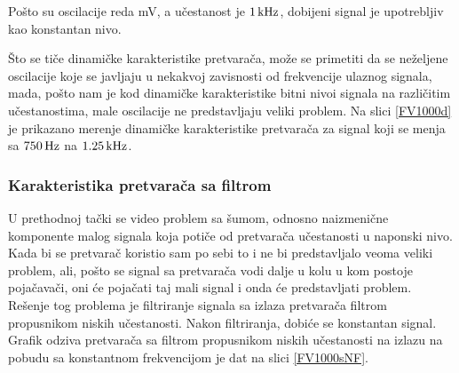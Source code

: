 \documentclass[a4paper, 12pt, diplomski]{etf}
\begin{document}
Pošto su oscilacije reda mV, a učestanost je $1\, \rm{kHz}$, dobijeni signal je upotrebljiv kao konstantan nivo. 

Što se tiče dinamičke karakteristike pretvarača, može se primetiti da se neželjene oscilacije koje se javljaju u nekakvoj zavisnosti od frekvencije ulaznog signala, mada, pošto nam je kod dinamičke karakteristike bitni nivoi signala na različitim učestanostima, male oscilacije ne predstavljaju veliki problem. Na slici \ref{FV1000d} je prikazano merenje dinamičke karakteristike pretvarača za signal koji se menja sa $750\, \rm{Hz}$ na $1.25\, \rm{kHz}$.


\subsubsection{Karakteristika pretvarača sa filtrom}

U prethodnoj tački se video problem sa šumom, odnosno naizmenične komponente malog signala koja potiče od pretvarača učestanosti u naponski nivo. Kada bi se pretvarač koristio sam po sebi to i ne bi predstavljalo veoma veliki problem, ali, pošto se signal sa pretvarača vodi dalje u kolu u kom postoje pojačavači, oni će pojačati taj mali signal i onda će predstavljati problem. Rešenje tog problema je filtriranje signala sa izlaza pretvarača filtrom propusnikom niskih učestanosti. Nakon filtriranja, dobiće se konstantan signal. Grafik odziva pretvarača sa filtrom propusnikom niskih učestanosti na izlazu na pobudu sa konstantnom frekvencijom je dat na slici \ref{FV1000sNF}.
\end{document}
